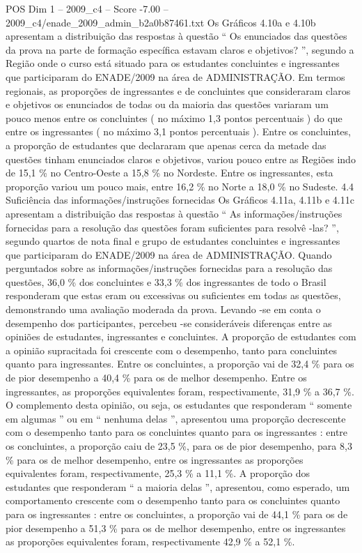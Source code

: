 \begin{textsample}{POS Dim 1 – 2009\_c4 – Score -7.00 – 2009\_c4/enade\_2009\_admin\_b2a0b87461.txt}
Os Gráficos 4.10a e 4.10b apresentam a distribuição das respostas à questão “ Os enunciados das questões da prova na parte de formação específica estavam claros e objetivos? ”, segundo a Região onde o curso está situado para os estudantes concluintes e ingressantes que participaram do ENADE/2009 na área de ADMINISTRAÇÃO.
Em termos regionais, as proporções de ingressantes e de concluintes que consideraram claros e objetivos os enunciados de todas ou da maioria das questões variaram um pouco menos entre os concluintes ( no máximo 1,3 pontos percentuais ) do que entre os ingressantes ( no máximo 3,1 pontos percentuais ).
Entre os concluintes, a proporção de estudantes que declararam que apenas cerca da metade das questões tinham enunciados claros e objetivos, variou pouco entre as Regiões indo de 15,1 \% no Centro-Oeste a 15,8 \% no Nordeste.
Entre os ingressantes, esta proporção variou um pouco mais, entre 16,2 \% no Norte a 18,0 \% no Sudeste. 4.4 Suficiência das informações/instruções fornecidas Os Gráficos 4.11a, 4.11b e 4.11c apresentam a distribuição das respostas à questão “ As informações/instruções fornecidas para a resolução das questões foram suficientes para resolvê -las? ”, segundo quartos de nota final e grupo de estudantes concluintes e ingressantes que participaram do ENADE/2009 na área de ADMINISTRAÇÃO.
Quando perguntados sobre as informações/instruções fornecidas para a resolução das questões, 36,0 \% dos concluintes e 33,3 \% dos ingressantes de todo o Brasil responderam que estas eram ou excessivas ou suficientes em todas as questões, demonstrando uma avaliação moderada da prova.
Levando -se em conta o desempenho dos participantes, percebeu -se consideráveis diferenças entre as opiniões de estudantes, ingressantes e concluintes.
A proporção de estudantes com a opinião supracitada foi crescente com o desempenho, tanto para concluintes quanto para ingressantes.
Entre os concluintes, a proporção vai de 32,4 \% para os de pior desempenho a 40,4 \% para os de melhor desempenho.
Entre os ingressantes, as proporções equivalentes foram, respectivamente, 31,9 \% a 36,7 \%.
O complemento desta opinião, ou seja, os estudantes que responderam “ somente em algumas ” ou em “ nenhuma delas ”, apresentou uma proporção decrescente com o desempenho tanto para os concluintes quanto para os ingressantes : entre os concluintes, a proporção caiu de 23,5 \%, para os de pior desempenho, para 8,3 \% para os de melhor desempenho, entre os ingressantes as proporções equivalentes foram, respectivamente, 25,3 \% a 11,1 \%.
A proporção dos estudantes que responderam “ a maioria delas ”, apresentou, como esperado, um comportamento crescente com o desempenho tanto para os concluintes quanto para os ingressantes : entre os concluintes, a proporção vai de 44,1 \% para os de pior desempenho a 51,3 \% para os de melhor desempenho, entre os ingressantes as proporções equivalentes foram, respectivamente 42,9 \% a 52,1 \%.

\end{textsample}
